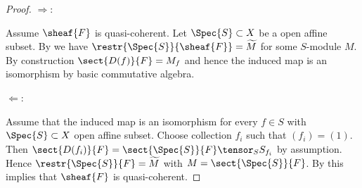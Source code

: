 \begin{proof}
$\Rightarrow$:

Assume $\sheaf{F}$ is quasi-coherent.
Let $\Spec{S}\subset X$ be a open affine subset.
By  we have $\restr{\Spec{S}}{\sheaf{F}} = \widetilde{M}$
for some $S$-module $M$.
By construction $\sect{D(f)}{F} = M_f$ and hence the induced map is an isomorphism
by basic commutative algebra.

$\Leftarrow$:

Assume that the induced map  is an isomorphism
for every $f\in S$ with $\Spec{S}\subset X$ open affine subset.
Choose collection $f_i$ such that $(f_i)=(1)$.
Then $\sect{D(f_i)}{F} = \sect{\Spec{S}}{F} \tensor_{S} S_{f_i}$ by assumption.
Hence $\restr{\Spec{S}}{F} = \widetilde{M}$
with $M = \sect{\Spec{S}}{F}$.
By  this implies that $\sheaf{F}$ is quasi-coherent.
\end{proof}
